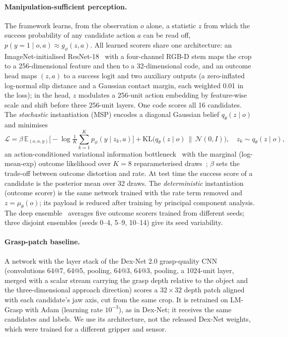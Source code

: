 \paragraph{Manipulation-sufficient perception.} The framework learns, from the observation $o$ alone, a statistic $z$ from which the success probability of any candidate action $a$ can be read off, $p(y{=}1\mid o,a)\approx g_\phi(z,a)$. All learned scorers share one architecture: an ImageNet-initialised ResNet-18~\cite{he2016resnet,deng2009imagenet} with a four-channel RGB-D stem maps the crop to a 256-dimensional feature and then to a 32-dimensional code, and an outcome head maps $(z,a)$ to a success logit and two auxiliary outputs (a zero-inflated log-normal slip distance and a Gaussian contact margin, each weighted 0.01 in the loss); in the head, $z$ modulates a 256-unit action embedding by feature-wise scale and shift before three 256-unit layers. One code scores all 16 candidates. The \emph{stochastic} instantiation (MSP) encodes a diagonal Gaussian belief $q_\theta(z\mid o)$ and minimises
\begin{equation}
\mathcal{L}=\beta\,\mathbb{E}_{(o,a,y)}\Big[-\log \tfrac{1}{K}\textstyle\sum_{k=1}^{K} p_\phi(y\mid z_k,a)\Big]+\mathrm{KL}\big(q_\theta(z\mid o)\,\|\,\mathcal{N}(0,I)\big),\quad z_k\sim q_\theta(z\mid o),
\end{equation}
an action-conditioned variational information bottleneck~\cite{tishby2000ib,alemi2017vib} with the marginal (log-mean-exp) outcome likelihood over $K=8$ reparameterised draws~\cite{kingma2014vae}; $\beta$ sets the trade-off between outcome distortion and rate. At test time the success score of a candidate is the posterior mean over 32 draws. The \emph{deterministic} instantiation (outcome scorer) is the same network trained with the rate term removed and $z=\mu_\theta(o)$; its payload is reduced after training by principal component analysis. The deep ensemble~\cite{lakshminarayanan2017} averages five outcome scorers trained from different seeds; three disjoint ensembles (seeds 0--4, 5--9, 10--14) give its seed variability.
\paragraph{Grasp-patch baseline.} A network with the layer stack of the Dex-Net 2.0 grasp-quality CNN~\cite{mahler2017dexnet} (convolutions 64@7, 64@5, pooling, 64@3, 64@3, pooling, a 1024-unit layer, merged with a scalar stream carrying the grasp depth relative to the object and the three-dimensional approach direction) scores a $32\times32$ depth patch aligned with each candidate's jaw axis, cut from the same crop. It is retrained on LM-Grasp with Adam (learning rate $10^{-3}$), as in Dex-Net; it receives the same candidates and labels. We use its architecture, not the released Dex-Net weights, which were trained for a different gripper and sensor.
